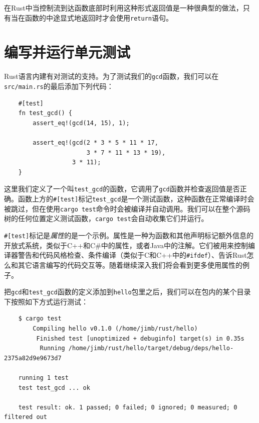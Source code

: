 在Rust中当控制流到达函数底部时利用这种形式返回值是一种很典型的做法，只有当在函数的中途显式地返回时才会使用\texttt{return}语句。

\section{编写并运行单元测试}
Rust语言内建有对测试的支持。为了测试我们的\texttt{gcd}函数，我们可以在\texttt{src/main.rs}的最后添加下列代码：
\begin{verbatim}
    #[test]
    fn test_gcd() {
        assert_eq!(gcd(14, 15), 1);

        assert_eq!(gcd(2 * 3 * 5 * 11 * 17,
                       3 * 7 * 11 * 13 * 19),
                   3 * 11);
    }
\end{verbatim}

这里我们定义了一个叫\texttt{test\_gcd}的函数，它调用了\texttt{gcd}函数并检查返回值是否正确。函数上方的\texttt{\#[test]}标记\texttt{test\_gcd}是一个测试函数，这种函数在正常编译时会被跳过，但在使用\texttt{cargo test}命令时会被编译并自动调用。我们可以在整个源码树的任何位置定义测试函数，\texttt{cargo test}会自动收集它们并运行。

\texttt{\#[test]}标记是\emph{属性}的是一个示例。属性是一种为函数和其他声明标记额外信息的开放式系统，类似于C++和C\#中的属性，或者Java中的注解。它们被用来控制编译器警告和代码风格检查、条件编译（类似于C和C++中的\texttt{\#ifdef}）、告诉Rust怎么和其它语言编写的代码交互等。随着继续深入我们将会看到更多使用属性的例子。

把\texttt{gcd}和\texttt{test\_gcd}函数的定义添加到\texttt{hello}包里之后，我们可以在包内的某个目录下按照如下方式运行测试：
\begin{verbatim}
    $ cargo test
        Compiling hello v0.1.0 (/home/jimb/rust/hello)
         Finished test [unoptimized + debuginfo] target(s) in 0.35s
          Running /home/jimb/rust/hello/target/debug/deps/hello-2375a82d9e9673d7

    running 1 test
    test test_gcd ... ok
    
    test result: ok. 1 passed; 0 failed; 0 ignored; 0 measured; 0 filtered out
\end{verbatim}

